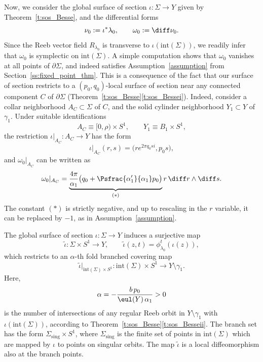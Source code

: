Now, we consider the global surface of section $\iota:\Sigma\to Y$ given by Theorem~\ref{t:sos_Besse}, and the differential forms
\[
\nu_0:=\iota^*\lambda_0,
\qquad
\omega_0:=\diff\nu_0.
\]
Since the Reeb vector field $R_{\lambda_0}$ is transverse to $\iota(\mathrm{int}(\Sigma))$, we readily infer that $\omega_0$ is symplectic on $\mathrm{int}(\Sigma)$. A simple computation shows that $\omega_0$ vanishes at all points of $\partial\Sigma$, and indeed satisfies Assumption~\ref{assumption} from Section~\ref{ss:fixed_point_thm}. This is a consequence of the fact that our surface of section restricts to a $(p_0,q_0)$-local surface of section near any connected component $C$ of $\partial\Sigma$ (Theorem~\ref{t:sos_Besse}\eqref{t:sos_Bessei}). Indeed, consider a collar neighborhood $A_C\subset \Sigma$ of $C$, and the solid cylinder neighborhood $Y_1\subset Y$ of $\gamma_1$. Under suitable identifications
\[
A_C\equiv [0,\rho)\times S^1,\qquad Y_1\equiv B_1\times S^1,
\]
the restriction $\iota|_{A_C}:A_C\to Y$ has the form
\[
\iota|_{A_C}(r,s)=\big( r e^{2\pi q_0 s i},p_0s \big),
\]
and $\omega_0|_{A_C}$ can be written as
\begin{equation}
\label{e:omega_0_annulus}
\omega_0|_{A_C}
=
\underbrace{\frac{4\pi}{\alpha_1} \big( q_0+\Psfrac{\alpha_1'}{\alpha_1}p_0\big)}_{(*)} r\,\diff r\wedge\diff s.
\end{equation}
The constant $(*)$ is strictly negative, and up to rescaling in the $r$ variable, it can be replaced by $-1$, as in Assumption~\ref{assumption}.

The global surface of section $\iota:\Sigma\to Y$ induces a surjective map
\[
\tilde \iota:\Sigma\times S^1\to Y,\qquad \tilde\iota(z,t)=\phi_{\lambda_0}^t(\iota(z)),
\]
which restricts to an $\alpha$-th fold branched covering map
\begin{equation}
\label{e:alpha_covering_map}
\tilde \iota|_{\mathrm{int}(\Sigma)\times S^1}:\mathrm{int}(\Sigma)\times S^1\to Y\setminus\gamma_1.
\end{equation}
Here,
\[
\alpha=- \frac{b\, p_0}{\eul(Y)\, \alpha_1}>0
\]
is the number of intersections of any regular Reeb orbit in $Y\setminus\gamma_1$ with $\iota(\mathrm{int}(\Sigma))$, according to Theorem~\ref{t:sos_Besse}\eqref{t:sos_Besseii}. The branch set has the form $\Sigma_{\mathrm{sing}}\times S^1$, where $\Sigma_{\mathrm{sing}}$ is the finite set of points in $\mathrm{int}(\Sigma)$ which are mapped by $\iota$ to points on singular orbits. The map $\tilde\iota$ is a local diffeomorphism also at the branch points.

